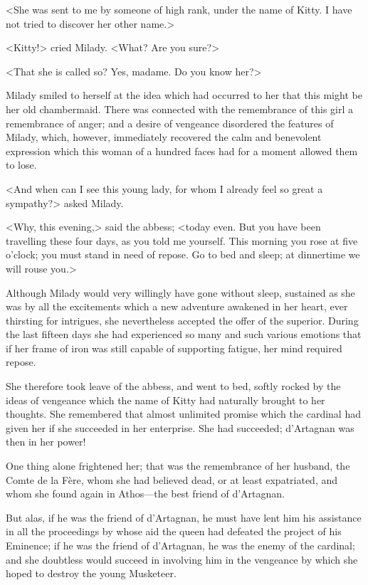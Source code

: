 <She was sent to me by someone of high rank, under the name of Kitty. I have not tried to discover her other name.> 

<Kitty!> cried Milady. <What? Are you sure?> 

<That she is called so? Yes, madame. Do you know her?> 

Milady smiled to herself at the idea which had occurred to her that this might be her old chambermaid. There was connected with the remembrance of this girl a remembrance of anger; and a desire of vengeance disordered the features of Milady, which, however, immediately recovered the calm and benevolent expression which this woman of a hundred faces had for a moment allowed them to lose. 

<And when can I see this young lady, for whom I already feel so great a sympathy?> asked Milady. 

<Why, this evening,> said the abbess; <today even. But you have been travelling these four days, as you told me yourself. This morning you rose at five o'clock; you must stand in need of repose. Go to bed and sleep; at dinnertime we will rouse you.> 

Although Milady would very willingly have gone without sleep, sustained as she was by all the excitements which a new adventure awakened in her heart, ever thirsting for intrigues, she nevertheless accepted the offer of the superior. During the last fifteen days she had experienced so many and such various emotions that if her frame of iron was still capable of supporting fatigue, her mind required repose. 

She therefore took leave of the abbess, and went to bed, softly rocked by the ideas of vengeance which the name of Kitty had naturally brought to her thoughts. She remembered that almost unlimited promise which the cardinal had given her if she succeeded in her enterprise. She had succeeded; d'Artagnan was then in her power! 

One thing alone frightened her; that was the remembrance of her husband, the Comte de la Fère, whom she had believed dead, or at least expatriated, and whom she found again in Athos---the best friend of d'Artagnan. 

But alas, if he was the friend of d'Artagnan, he must have lent him his assistance in all the proceedings by whose aid the queen had defeated the project of his Eminence; if he was the friend of d'Artagnan, he was the enemy of the cardinal; and she doubtless would succeed in involving him in the vengeance by which she hoped to destroy the young Musketeer. 

